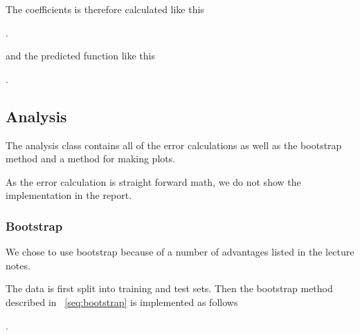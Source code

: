 The coefficients is therefore calculated like this 

.

and the predicted function like this 

.

\subsection{Analysis} 
The analysis class contains all of the error calculations as well 
as the bootstrap method and a method for making plots.

As the error calculation is straight forward math, we do not 
show the implementation in the report. 

\subsubsection{Bootstrap} 
We chose to use bootstrap because of a number of advantages listed in the 
lecture notes. ~\cite{LectureNotes-FysStk}

The data is first split into training and test sets. 
Then the bootstrap method described in ~\ref{seq:bootstrap} is 
implemented as follows

.
~\cite{BiasAndVariance}




